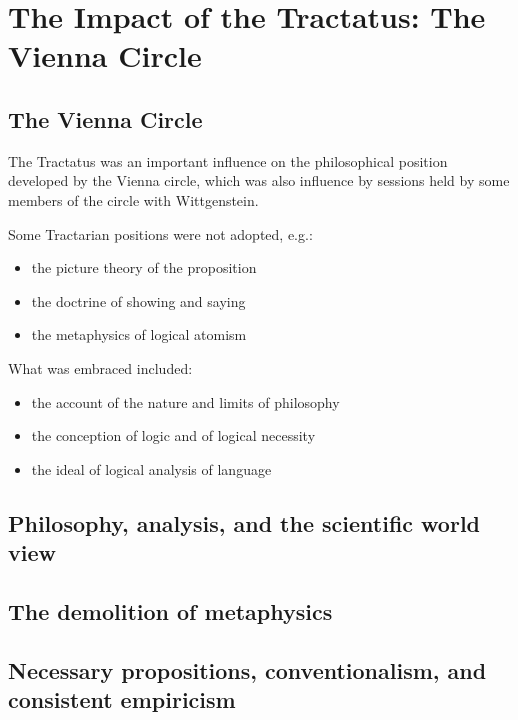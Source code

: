 \chapter{The Impact of the Tractatus: The Vienna Circle}

\section{The Vienna Circle}

The Tractatus was an important influence on the philosophical position developed by the Vienna circle, which was also influence by sessions held by some members of the circle with Wittgenstein.

Some Tractarian positions were not adopted, e.g.:

\begin{itemize}
\item the picture theory of the proposition
\item the doctrine of showing and saying
\item the metaphysics of logical atomism
\end{itemize}



What was embraced included:

\begin{itemize}
\item the account of the nature and limits of philosophy
\item the conception of logic and of logical necessity
\item the ideal of logical analysis of language
\end{itemize}

\vspace{2in}

\section{Philosophy, analysis, and the scientific world view}

\section{The demolition of metaphysics}

\section{Necessary propositions, conventionalism, and consistent empiricism}

